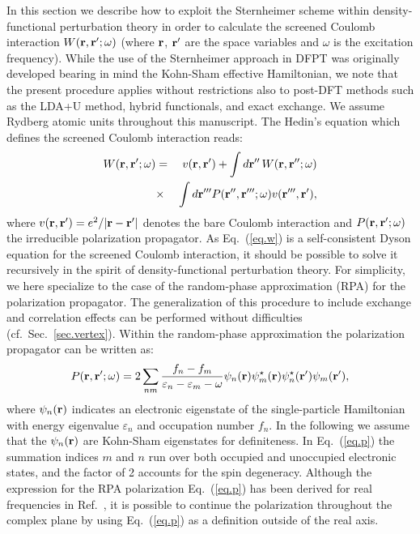\documentclass[twocolumn,prb,showpacs,superscriptaddress]{revtex4}
\def\w{\omega}
\def\E{\varepsilon}
\def\r{{\bf r}}
\def\rp{{\bf r^\prime}}
\def\rpp{{\bf r^{\prime\prime}}}
\def\rppp{{\bf r^{\prime\prime\prime}}}
\begin{document}
In this section we describe how to exploit the Sternheimer scheme within density-functional
perturbation theory in order to calculate the screened Coulomb interaction
$W(\r,\rp;\w)$ (where $\r$, $\rp$ are the space variables and $\w$ is the
excitation frequency). While the use of the Sternheimer approach in DFPT 
was originally developed bearing in mind the Kohn-Sham effective Hamiltonian, 
we note that the present procedure applies without restrictions also to 
post-DFT methods such as the LDA+U method,\cite{ldau} hybrid 
functionals,\cite{hybrids} and exact exchange.\cite{exx}
We assume Rydberg atomic units throughout this manuscript. 
The Hedin's equation which defines the screened Coulomb 
interaction reads:\cite{hl}
  \begin{eqnarray}\label{eq.w}
  W(\r,\rp;\w) & = & v(\r,\rp) + \int d\rpp \,W(\r,\rpp;\w)  \nonumber \\
   & \times & \int d\rppp P(\rpp,\rppp;\w) v(\rppp,\rp),
  \end{eqnarray}
where $v(\r,\rp)=e^2/|\r-\rp|$ denotes the bare Coulomb interaction and 
$P(\r,\rp;\w)$ the irreducible polarization propagator. 
As Eq.\ (\ref{eq.w}) is a self-consistent Dyson equation for the
screened Coulomb interaction, it should be possible to solve it
recursively in the spirit of density-functional perturbation theory.
For simplicity, we here specialize to the case of the random-phase approximation (RPA)
for the polarization propagator. 
The generalization of this procedure to include exchange and correlation
effects can be performed without difficulties (cf.\ Sec.~\ref{sec.vertex}).
Within the random-phase approximation the polarization propagator can be written as:\cite{hl}
  \begin{equation}\label{eq.p}
  P(\r,\rp;\w) = 2\sum_{n m} \frac{f_n-f_m}{\E_n-\E_m-\w} 
  \psi_n(\r)\psi_m^\star(\r)  \psi_n^\star(\rp)\psi_m(\rp),
  \end{equation}
where $\psi_n(\r)$ indicates an electronic eigenstate of the
single-particle Hamiltonian 
with energy eigenvalue $\E_n$ and occupation number $f_n$. 
In the following we assume that the $\psi_n(\r)$ are Kohn-Sham
eigenstates for definiteness.
In Eq.\ (\ref{eq.p}) the summation indices $m$ and $n$ run over
both occupied and unoccupied electronic states, and the factor of 2 accounts for the
spin degeneracy.\cite{hl}
Although the expression for the RPA polarization Eq.~(\ref{eq.p})
has been derived for real frequencies in Ref.\ , it
is possible to continue the polarization throughout the complex 
plane by using Eq.~(\ref{eq.p}) as a definition outside of the real axis.
\end{document}
